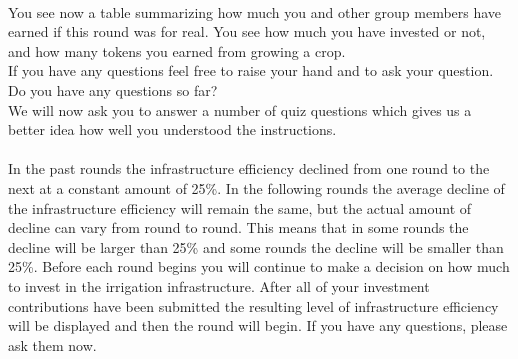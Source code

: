 \documentclass[11pt]{article}
\begin{document}
 \\


You see now a table summarizing how much you and other group members have earned
if this round was for real. You see how much you have invested or not,
and how many tokens you earned from growing a crop. \\

If you have any questions feel free to raise your hand and to ask your
question. Do you have any questions so far?\\

We will now ask you to answer a number of quiz questions which gives
us a better idea how well you understood the instructions. \\


 \\

In the past rounds the infrastructure efficiency declined from
one round to the next at a constant amount of 25\%. In the
following rounds the average decline of the infrastructure
efficiency will remain the same, but the actual amount of
decline can vary from round to round. This means that in some
rounds the decline will be larger than 25\% and some rounds the
decline will be smaller than 25\%. Before each round begins you
will continue to make a decision on how much to invest in the
irrigation infrastructure. After all of your investment
contributions have been submitted the resulting level of
infrastructure efficiency will be displayed and then the round
will begin. If you have any questions, please ask them now.
\end{document}
